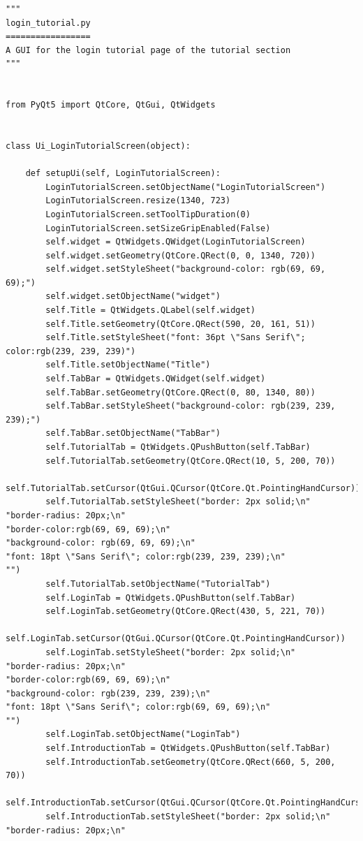\documentclass{article}
\begin{document}
\begin{lstlisting}
"""
login_tutorial.py
=================
A GUI for the login tutorial page of the tutorial section
"""


from PyQt5 import QtCore, QtGui, QtWidgets


class Ui_LoginTutorialScreen(object):

    def setupUi(self, LoginTutorialScreen):
        LoginTutorialScreen.setObjectName("LoginTutorialScreen")
        LoginTutorialScreen.resize(1340, 723)
        LoginTutorialScreen.setToolTipDuration(0)
        LoginTutorialScreen.setSizeGripEnabled(False)
        self.widget = QtWidgets.QWidget(LoginTutorialScreen)
        self.widget.setGeometry(QtCore.QRect(0, 0, 1340, 720))
        self.widget.setStyleSheet("background-color: rgb(69, 69, 69);")
        self.widget.setObjectName("widget")
        self.Title = QtWidgets.QLabel(self.widget)
        self.Title.setGeometry(QtCore.QRect(590, 20, 161, 51))
        self.Title.setStyleSheet("font: 36pt \"Sans Serif\"; color:rgb(239, 239, 239)")
        self.Title.setObjectName("Title")
        self.TabBar = QtWidgets.QWidget(self.widget)
        self.TabBar.setGeometry(QtCore.QRect(0, 80, 1340, 80))
        self.TabBar.setStyleSheet("background-color: rgb(239, 239, 239);")
        self.TabBar.setObjectName("TabBar")
        self.TutorialTab = QtWidgets.QPushButton(self.TabBar)
        self.TutorialTab.setGeometry(QtCore.QRect(10, 5, 200, 70))
        self.TutorialTab.setCursor(QtGui.QCursor(QtCore.Qt.PointingHandCursor))
        self.TutorialTab.setStyleSheet("border: 2px solid;\n"
"border-radius: 20px;\n"
"border-color:rgb(69, 69, 69);\n"
"background-color: rgb(69, 69, 69);\n"
"font: 18pt \"Sans Serif\"; color:rgb(239, 239, 239);\n"
"")
        self.TutorialTab.setObjectName("TutorialTab")
        self.LoginTab = QtWidgets.QPushButton(self.TabBar)
        self.LoginTab.setGeometry(QtCore.QRect(430, 5, 221, 70))
        self.LoginTab.setCursor(QtGui.QCursor(QtCore.Qt.PointingHandCursor))
        self.LoginTab.setStyleSheet("border: 2px solid;\n"
"border-radius: 20px;\n"
"border-color:rgb(69, 69, 69);\n"
"background-color: rgb(239, 239, 239);\n"
"font: 18pt \"Sans Serif\"; color:rgb(69, 69, 69);\n"
"")
        self.LoginTab.setObjectName("LoginTab")
        self.IntroductionTab = QtWidgets.QPushButton(self.TabBar)
        self.IntroductionTab.setGeometry(QtCore.QRect(660, 5, 200, 70))
        self.IntroductionTab.setCursor(QtGui.QCursor(QtCore.Qt.PointingHandCursor))
        self.IntroductionTab.setStyleSheet("border: 2px solid;\n"
"border-radius: 20px;\n"

\end{lstlisting}
\end{document}

